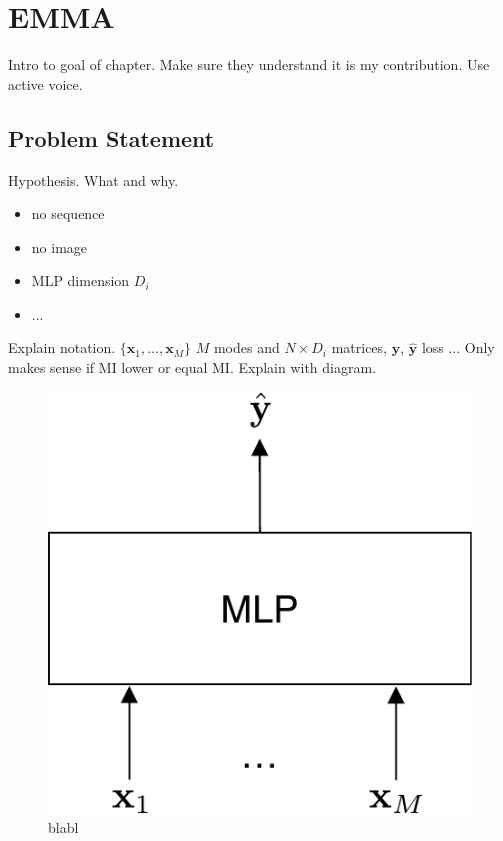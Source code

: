 \chapter{EMMA} 
\label{chapter-5} 

Intro to goal of chapter. Make sure they understand it is my contribution. Use active voice.


\section{Problem Statement}

Hypothesis. What and why.
\begin{itemize}
\item no sequence
\item no image
\item MLP dimension $D_i$ 
\item ...\\
\end{itemize}

Explain notation. $\{\mathbf{x}_1, \ldots, \mathbf{x}_M\}$ $M$ modes and $N \times D_i$ matrices, $\mathbf{y}$, $\hat{\mathbf{y}}$ loss ... Only makes sense if MI lower or equal MI. Explain with diagram.
\begin{figure}[!h]
\centering
\includegraphics[scale=0.5]{figures/mlp-without-emma}
\caption{blabl}	
\label{fig:summary}
\end{figure}

